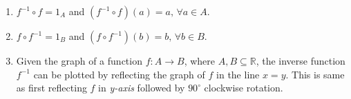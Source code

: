 \documentclass[a4paper,english,12pt]{article}
\begin{document}
\begin{rem} 
\begin{enumerate}
\item $f^{-1}\circ f=1_A$ and $(f^{-1}\circ f)(a)=a,\,\forall a\in A$.
\item $f\circ f^{-1}=1_B$ and $(f\circ f^{-1})(b)=b,\,\forall b\in B$.
\item Given the graph of a function $f:A \to B$, where $A,B\subseteq \mathbb{R}$, the inverse function $f^{-1}$ can be plotted by reflecting the graph of $f$ in the line $x=y$. This is same as first reflecting $f$ in \textit{y-axis} followed by $90^{\circ}$ clockwise rotation.
\end{enumerate}
\end{rem}
\end{document}

